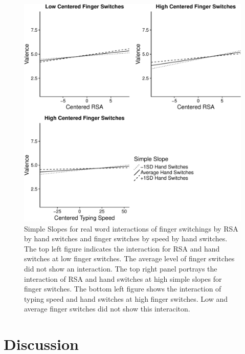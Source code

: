 \documentclass[english,man, mask]{apa6}
\theoremstyle{definition}
\theoremstyle{definition}
\theoremstyle{definition}
\theoremstyle{remark}
\begin{document}
\begin{figure}
\centering
\includegraphics{QWERTY_files/figure-latex/graphs2-1.pdf}
\caption{\label{fig:graphs2}Simple Slopes for real word interactions of
finger switchings by RSA by hand switches and finger switches by speed
by hand switches. The top left figure indicates the interaction for RSA
and hand switches at low finger switches. The average level of finger
switches did not show an interaction. The top right panel portrays the
interaction of RSA and hand switches at high simple slopes for finger
switches. The bottom left figure shows the interaction of typing speed
and hand switches at high finger switches. Low and average finger
switches did not show this interaciton.}
\end{figure}

\section{Discussion}\label{discussion}
\end{document}

